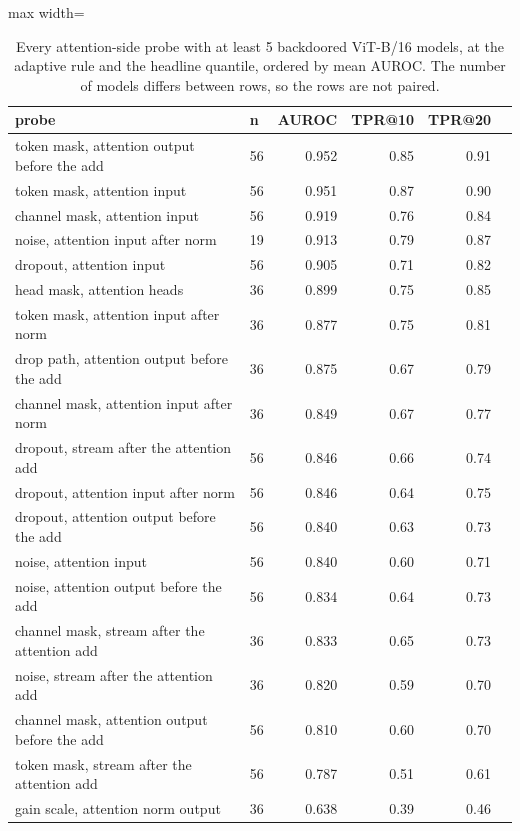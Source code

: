 \begin{table}[htbp]
\centering
\small
\caption{Every attention-side probe with at least 5 backdoored ViT-B/16 models, at the adaptive rule and the headline quantile, ordered by mean AUROC. The number of models differs between rows, so the rows are not paired.}
\label{tab:attention-probes}
\begin{adjustbox}{max width=\linewidth}
\begin{tabular}{llrrrr}
\toprule
probe & n & AUROC & TPR@10 & TPR@20 \\
\midrule
token mask, attention output before the add & 56 & 0.952 & 0.85 & 0.91 \\
token mask, attention input & 56 & 0.951 & 0.87 & 0.90 \\
channel mask, attention input & 56 & 0.919 & 0.76 & 0.84 \\
noise, attention input after norm & 19 & 0.913 & 0.79 & 0.87 \\
dropout, attention input & 56 & 0.905 & 0.71 & 0.82 \\
head mask, attention heads & 36 & 0.899 & 0.75 & 0.85 \\
token mask, attention input after norm & 36 & 0.877 & 0.75 & 0.81 \\
drop path, attention output before the add & 36 & 0.875 & 0.67 & 0.79 \\
channel mask, attention input after norm & 36 & 0.849 & 0.67 & 0.77 \\
dropout, stream after the attention add & 56 & 0.846 & 0.66 & 0.74 \\
dropout, attention input after norm & 56 & 0.846 & 0.64 & 0.75 \\
dropout, attention output before the add & 56 & 0.840 & 0.63 & 0.73 \\
noise, attention input & 56 & 0.840 & 0.60 & 0.71 \\
noise, attention output before the add & 56 & 0.834 & 0.64 & 0.73 \\
channel mask, stream after the attention add & 36 & 0.833 & 0.65 & 0.73 \\
noise, stream after the attention add & 36 & 0.820 & 0.59 & 0.70 \\
channel mask, attention output before the add & 56 & 0.810 & 0.60 & 0.70 \\
token mask, stream after the attention add & 56 & 0.787 & 0.51 & 0.61 \\
gain scale, attention norm output & 36 & 0.638 & 0.39 & 0.46 \\
\bottomrule
\end{tabular}
\end{adjustbox}
\end{table}
